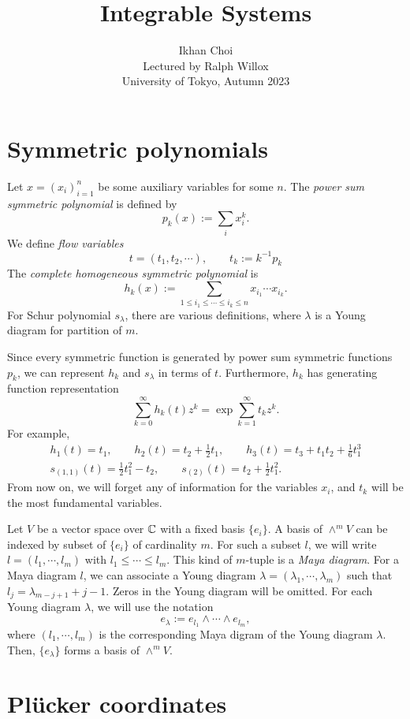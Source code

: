 \documentclass{../../../small}
\begin{document}
\title{Integrable Systems}
\author{Ikhan Choi\\Lectured by Ralph Willox\\University of Tokyo, Autumn 2023}
\maketitle


\section{Symmetric polynomials}
Let $x=(x_i)_{i=1}^n$ be some auxiliary variables for some $n$.
The \emph{power sum symmetric polynomial} is defined by
\[p_k(x):=\sum_ix_i^k.\]
We define \emph{flow variables}
\[t=(t_1,t_2,\cdots),\qquad t_k:=k^{-1}p_k\]
The \emph{complete homogeneous symmetric polynomial} is
\[h_k(x):=\sum_{1\le i_1\le\cdots\le i_k\le n}x_{i_1}\cdots x_{i_k}.\]
For Schur polynomial $s_\lambda$, there are various definitions, where $\lambda$ is a Young diagram for partition of $m$.

Since every symmetric function is generated by power sum symmetric functions $p_k$, we can represent $h_k$ and $s_\lambda$ in terms of $t$.
Furthermore, $h_k$ has generating function representation
\[\sum_{k=0}^\infty h_k(t)z^k=\exp{\sum_{k=1}^\infty t_kz^k}.\]
For example,
\begin{gather*}
h_1(t)=t_1,\qquad h_2(t)=t_2+\frac12t_1,\qquad h_3(t)=t_3+t_1t_2+\frac16t_1^3\\
s_{(1,1)}(t)=\frac12 t_1^2-t_2,\qquad s_{(2)}(t)=t_2+\frac12t_1^2.
\end{gather*}
From now on, we will forget any of information for the variables $x_i$, and $t_k$ will be the most fundamental variables.


Let $V$ be a vector space over $\mathbb{C}$ with a fixed basis $\{e_i\}$.
A basis of $\wedge^mV$ can be indexed by subset of $\{e_i\}$ of cardinality $m$.
For such a subset $l$, we will write $l=(l_1,\cdots,l_m)$ with $l_1\le\cdots\le l_m$.
This kind of $m$-tuple is a \emph{Maya diagram}.
For a Maya diagram $l$, we can associate a Young diagram $\lambda=(\lambda_1,\cdots,\lambda_m)$ such that $l_j=\lambda_{m-j+1}+j-1$.
Zeros in the Young diagram will be omitted.
For each Young diagram $\lambda$, we will use the notation
\[e_\lambda:=e_{l_1}\wedge\cdots\wedge e_{l_m},\]
where $(l_1,\cdots,l_m)$ is the corresponding Maya digram of the Young diagram $\lambda$.
Then, $\{e_\lambda\}$ forms a basis of $\wedge^mV$.

\section{Pl\"ucker coordinates}
\end{document}
